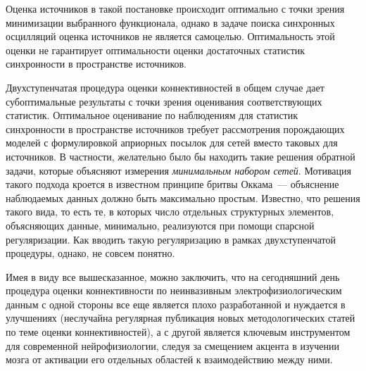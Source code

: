 Оценка источников в такой постановке происходит оптимально с точки зрения минимизации
выбранного функционала, однако в задаче поиска синхронных осцилляций оценка источников не
является самоцелью. Оптимальность этой оценки не гарантирует оптимальности оценки
достаточных статистик синхронности в пространстве источников.

Двухступенчатая процедура оценки коннективностей в общем случае
дает субоптимальные результаты с точки зрения оценивания соответствующих статистик.
Оптимальное оценивание по наблюдениям для статистик синхронности в пространстве источников требует
рассмотрения порождающих моделей с формулировкой априорных посылок для сетей вместо таковых для
источников. В частности, желательно было бы находить такие решения обратной задачи, которые
объясняют измерения \emph{минимальным набором сетей}. Мотивация такого подхода кроется в известном
принципе бритвы Оккама~--- объяснение наблюдаемых данных должно быть максимально простым.
Известно, что решения такого вида, то есть те, в которых число отдельных структурных элементов,
объясняющих данные, минимально, реализуются при помощи спарсной регуляризации.
Как вводить такую регуляризацию в рамках двухступенчатой процедуры, однако, не совсем
понятно.




Имея в виду все вышесказанное, можно заключить, что на сегодняшний день
процедура оценки коннективности по неинвазивным электрофизиологическим данным с одной стороны
все еще является плохо разработанной и нуждается в улучшениях (неслучайна
регулярная публикация новых методологических статей по теме оценки коннективностей),
а с другой является ключевым инструментом для современной нейрофизиологии,
следуя за смещением акцента в изучении мозга от активации его отдельных областей к взаимодействию
между ними.

